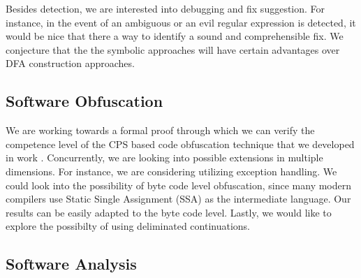 \documentclass[12pt]{article}
\theoremstyle{plain} \numberwithin{equation}{section}
\theoremstyle{definition}
\newcommand{\kl}[1]{}
\begin{document}
Besides detection, we are interested into debugging and fix
suggestion. For instance, in the event of an ambiguous or an evil
regular expression is detected, it would be nice that there a way to
identify a sound and comprehensible fix. We conjecture that the 
the symbolic approaches will have certain advantages over DFA
construction approaches.


\subsection{Software Obfuscation}
We are working towards a formal proof through which we can verify the
competence level of the CPS based code obfuscation technique that we
developed in work \cite{DBLP:conf/pepm/Lu19}.  Concurrently, we are
looking into possible extensions in multiple dimensions. For instance,
we are considering utilizing exception handling. We could look into
the possibility of byte code level obfuscation, since many modern
compilers use Static Single Assignment (SSA) as the intermediate
language. Our results can be easily adapted to the byte code level.
Lastly, we would like to explore the possibilty of using deliminated
continuations. 


\subsection{Software Analysis}

\kl{debugging}
\end{document}
